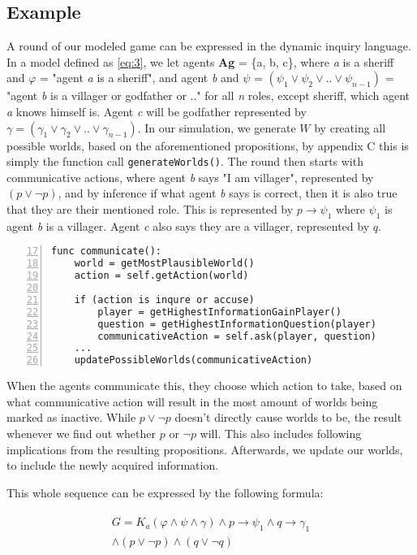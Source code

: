 \subsection{Example}
A round of our modeled game can be expressed in the dynamic inquiry language. In a model defined as \cref{eq:3}, we let agents \textbf{Ag} = \{a, b, c\}, where \textit{a} is a sheriff and $\varphi$ = "agent \textit{a} is a sheriff", and agent \textit{b} and $\psi$ = $(\psi_1 \lor \psi_2 \lor .. \lor \psi_{n-1})$ = "agent \textit{b} is a villager or godfather or .." for all \textit{n} roles, except sheriff, which agent \textit{a} knows himself is. Agent \textit{c} will be godfather represented by $\gamma = (\gamma_1 \lor \gamma_2 \lor .. \lor \gamma_{n-1}) $. In our simulation, we generate $W$ by creating all possible worlds, based on the aforementioned propositions, by appendix C this is simply the function call \lstinline{generateWorlds()}. The round then starts with communicative actions, where agent \textit{b} says "I am villager", represented by $(p \lor \neg p)$, and by inference if what agent \textit{b} says is correct, then it is also true that they are their mentioned role. This is represented by $p \rightarrow \psi_1$ where $\psi_1$ is agent \textit{b} is a villager. Agent \textit{c} also says they are a villager, represented by $q$. 

\begin{lstlisting}[basicstyle=\footnotesize\ttfamily, numbers=left, xleftmargin=0.5cm, firstnumber=17, caption={Snippet from appendix C}, captionpos=b]
func communicate():
	world = getMostPlausibleWorld()
	action = self.getAction(world)
	
	if (action is inqure or accuse)
		player = getHighestInformationGainPlayer()
		question = getHighestInformationQuestion(player)
		communicativeAction = self.ask(player, question)
	...
	updatePossibleWorlds(communicativeAction)
\end{lstlisting}
When the agents communicate this, they choose which action to take, based on what communicative action will result in the most amount of worlds being marked as inactive. While $p \lor \neg p$ doesn't directly cause worlds to be, the result whenever we find out whether $p$ or $\neg p$ will. This also includes following implications from the resulting propositions. Afterwards, we update our worlds, to include the newly acquired information. 

This whole sequence can be expressed by the following formula:

\begin{align}
	\begin{split}
		G = K_a(\varphi \land \psi \land\gamma)\land p \rightarrow \psi_1 \land q \rightarrow \gamma_1 \\ \land (p \lor \neg p) \land (q \lor \neg q) \label{eq:7}
	\end{split}
\end{align}

